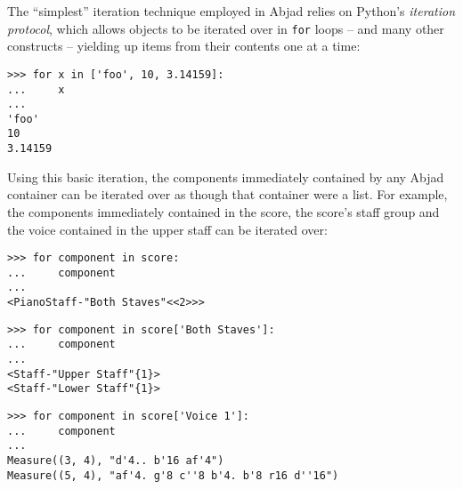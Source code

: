 \noindent The \enquote{simplest} iteration technique employed in Abjad relies
on Python's \emph{iteration protocol}, which allows objects to be iterated over
in \texttt{for} loops -- and many other constructs -- yielding up items from
their contents one at a time:

\begin{comment}
<abjad>
for x in ['foo', 10, 3.14159]:
    x

</abjad>
\end{comment}

\begin{abjadbookoutput}
\begin{singlespacing}
\vspace{-0.5\baselineskip}
\begin{verbatim}
>>> for x in ['foo', 10, 3.14159]:
...     x
...
'foo'
10
3.14159
\end{verbatim}
\end{singlespacing}
\end{abjadbookoutput}

\noindent Using this basic iteration, the components immediately contained by
any Abjad container can be iterated over as though that container were a list.
For example, the components immediately contained in the score, the score's
staff group and the voice contained in the upper staff can be iterated over:

\begin{comment}
<abjad>
for component in score:
    component

for component in score['Both Staves']:
    component

for component in score['Voice 1']:
    component

</abjad>
\end{comment}

\begin{abjadbookoutput}
\begin{singlespacing}
\vspace{-0.5\baselineskip}
\begin{verbatim}
>>> for component in score:
...     component
...
<PianoStaff-"Both Staves"<<2>>>
\end{verbatim}
\begin{verbatim}
>>> for component in score['Both Staves']:
...     component
...
<Staff-"Upper Staff"{1}>
<Staff-"Lower Staff"{1}>
\end{verbatim}
\begin{verbatim}
>>> for component in score['Voice 1']:
...     component
...
Measure((3, 4), "d'4.. b'16 af'4")
Measure((5, 4), "af'4. g'8 c''8 b'4. b'8 r16 d''16")
\end{verbatim}
\end{singlespacing}
\end{abjadbookoutput}

